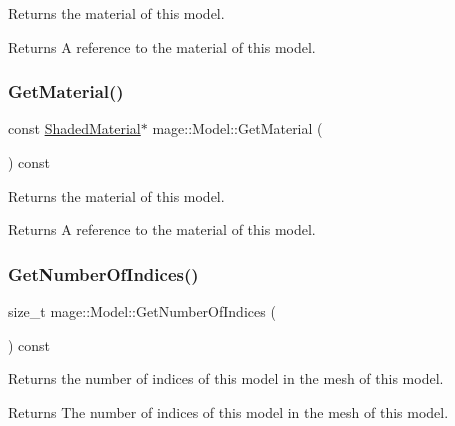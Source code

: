 Returns the material of this model.

\begin{DoxyReturn}{Returns}
A reference to the material of this model. 
\end{DoxyReturn}
\hypertarget{classmage_1_1_model_aa6ba2f2fbcb5aae6c1112f120e5d146c}{}\label{classmage_1_1_model_aa6ba2f2fbcb5aae6c1112f120e5d146c} 
\subsubsection{\texorpdfstring{Get\+Material()}{GetMaterial()}\hspace{0.1cm}{\footnotesize\ttfamily [2/2]}}
{\footnotesize\ttfamily const \hyperlink{structmage_1_1_shaded_material}{Shaded\+Material}$\ast$ mage\+::\+Model\+::\+Get\+Material (\begin{DoxyParamCaption}{ }\end{DoxyParamCaption}) const\hspace{0.3cm}{\ttfamily [noexcept]}}

Returns the material of this model.

\begin{DoxyReturn}{Returns}
A reference to the material of this model. 
\end{DoxyReturn}
\hypertarget{classmage_1_1_model_a37c9814a445159fd742bcc1b9a5a7b94}{}\label{classmage_1_1_model_a37c9814a445159fd742bcc1b9a5a7b94} 
\subsubsection{\texorpdfstring{Get\+Number\+Of\+Indices()}{GetNumberOfIndices()}}
{\footnotesize\ttfamily size\+\_\+t mage\+::\+Model\+::\+Get\+Number\+Of\+Indices (\begin{DoxyParamCaption}{ }\end{DoxyParamCaption}) const\hspace{0.3cm}{\ttfamily [noexcept]}}

Returns the number of indices of this model in the mesh of this model.

\begin{DoxyReturn}{Returns}
The number of indices of this model in the mesh of this model. 
\end{DoxyReturn}
\hypertarget{classmage_1_1_model_a876fcfe369f12e2d7edb6b533dd06252}{}\label{classmage_1_1_model_a876fcfe369f12e2d7edb6b533dd06252} 

